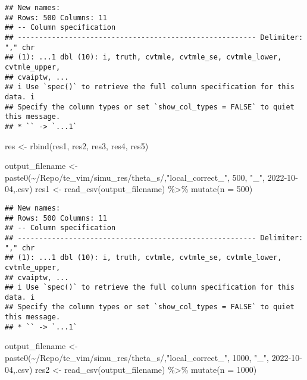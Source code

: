 \documentclass[
]{article}
\newenvironment{Shaded}{\begin{snugshade}}{\end{snugshade}}
\newcommand{\AttributeTok}[1]{\textcolor[rgb]{0.77,0.63,0.00}{#1}}
\newcommand{\DecValTok}[1]{\textcolor[rgb]{0.00,0.00,0.81}{#1}}
\newcommand{\FunctionTok}[1]{\textcolor[rgb]{0.00,0.00,0.00}{#1}}
\newcommand{\NormalTok}[1]{#1}
\newcommand{\OtherTok}[1]{\textcolor[rgb]{0.56,0.35,0.01}{#1}}
\newcommand{\SpecialCharTok}[1]{\textcolor[rgb]{0.00,0.00,0.00}{#1}}
\newcommand{\StringTok}[1]{\textcolor[rgb]{0.31,0.60,0.02}{#1}}
\begin{document}
\begin{verbatim}
## New names:
## Rows: 500 Columns: 11
## -- Column specification
## -------------------------------------------------------- Delimiter: "," chr
## (1): ...1 dbl (10): i, truth, cvtmle, cvtmle_se, cvtmle_lower, cvtmle_upper,
## cvaiptw, ...
## i Use `spec()` to retrieve the full column specification for this data. i
## Specify the column types or set `show_col_types = FALSE` to quiet this message.
## * `` -> `...1`
\end{verbatim}

\begin{Shaded}
\begin{Highlighting}[]
\NormalTok{res }\OtherTok{\textless{}{-}} \FunctionTok{rbind}\NormalTok{(res1, res2, res3, res4, res5)}
\end{Highlighting}
\end{Shaded}

\begin{Shaded}
\begin{Highlighting}[]
\NormalTok{output\_filename }\OtherTok{\textless{}{-}} \FunctionTok{paste0}\NormalTok{(}\StringTok{\textquotesingle{}\textasciitilde{}/Repo/te\_vim/simu\_res/theta\_s/\textquotesingle{}}\NormalTok{,}\StringTok{"local\_correct\_"}\NormalTok{, }\DecValTok{500}\NormalTok{, }\StringTok{"\_"}\NormalTok{, }\StringTok{\textquotesingle{}2022{-}10{-}04\textquotesingle{}}\NormalTok{,}\StringTok{\textquotesingle{}.csv\textquotesingle{}}\NormalTok{)}
\NormalTok{res1 }\OtherTok{\textless{}{-}} \FunctionTok{read\_csv}\NormalTok{(output\_filename) }\SpecialCharTok{\%\textgreater{}\%} \FunctionTok{mutate}\NormalTok{(}\AttributeTok{n =} \DecValTok{500}\NormalTok{)}
\end{Highlighting}
\end{Shaded}

\begin{verbatim}
## New names:
## Rows: 500 Columns: 11
## -- Column specification
## -------------------------------------------------------- Delimiter: "," chr
## (1): ...1 dbl (10): i, truth, cvtmle, cvtmle_se, cvtmle_lower, cvtmle_upper,
## cvaiptw, ...
## i Use `spec()` to retrieve the full column specification for this data. i
## Specify the column types or set `show_col_types = FALSE` to quiet this message.
## * `` -> `...1`
\end{verbatim}

\begin{Shaded}
\begin{Highlighting}[]
\NormalTok{output\_filename }\OtherTok{\textless{}{-}} \FunctionTok{paste0}\NormalTok{(}\StringTok{\textquotesingle{}\textasciitilde{}/Repo/te\_vim/simu\_res/theta\_s/\textquotesingle{}}\NormalTok{,}\StringTok{"local\_correct\_"}\NormalTok{, }\DecValTok{1000}\NormalTok{, }\StringTok{"\_"}\NormalTok{, }\StringTok{\textquotesingle{}2022{-}10{-}04\textquotesingle{}}\NormalTok{,}\StringTok{\textquotesingle{}.csv\textquotesingle{}}\NormalTok{)}
\NormalTok{res2 }\OtherTok{\textless{}{-}} \FunctionTok{read\_csv}\NormalTok{(output\_filename) }\SpecialCharTok{\%\textgreater{}\%} \FunctionTok{mutate}\NormalTok{(}\AttributeTok{n =} \DecValTok{1000}\NormalTok{)}
\end{Highlighting}
\end{Shaded}
\end{document}
